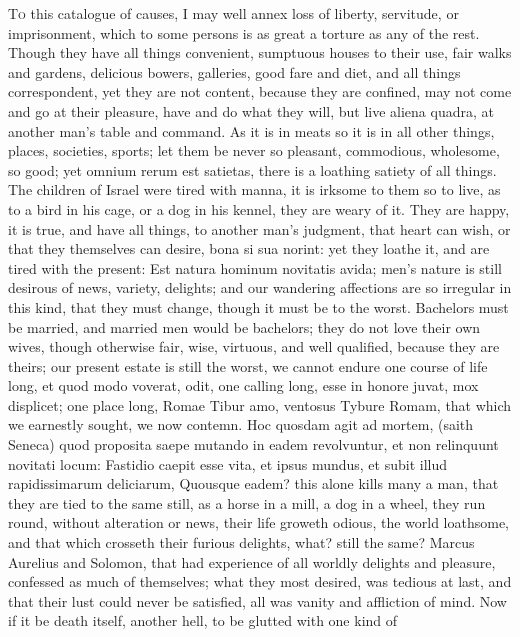 {\lettrine{T}{o} this catalogue of causes, I may well annex loss of liberty,
servitude, or imprisonment, which to some persons is as great a torture
as any of the rest. Though they have all things convenient, sumptuous
houses to their use, fair walks and gardens, delicious bowers,
galleries, good fare and diet, and all things correspondent, yet they
are not content, because they are confined, may not come and go at
their pleasure, have and do what they will, but live aliena
quadra, at another man's table and command. As it is in meats so
it is in all other things, places, societies, sports; let them be never
so pleasant, commodious, wholesome, so good; yet omnium rerum est
satietas, there is a loathing satiety of all things. The children of
Israel were tired with manna, it is irksome to them so to live, as to a
bird in his cage, or a dog in his kennel, they are weary of it. They
are happy, it is true, and have all things, to another man's judgment,
that heart can wish, or that they themselves can desire, bona si sua
norint: yet they loathe it, and are tired with the present: Est natura
hominum novitatis avida; men's nature is still desirous of news,
variety, delights; and our wandering affections are so irregular in
this kind, that they must change, though it must be to the worst.
Bachelors must be married, and married men would be bachelors; they do
not love their own wives, though otherwise fair, wise, virtuous, and
well qualified, because they are theirs; our present estate is still
the worst, we cannot endure one course of life long, et quod modo
voverat, odit, one calling long, esse in honore juvat, mox displicet;
one place long, Romae Tibur amo, ventosus Tybure Romam, that
which we earnestly sought, we now contemn. Hoc quosdam agit ad mortem,
(saith Seneca) quod proposita saepe mutando in eadem revolvuntur,
et non relinquunt novitati locum: Fastidio caepit esse vita, et ipsus
mundus, et subit illud rapidissimarum deliciarum, Quousque eadem? this
alone kills many a man, that they are tied to the same still, as a
horse in a mill, a dog in a wheel, they run round, without alteration
or news, their life groweth odious, the world loathsome, and that which
crosseth their furious delights, what? still the same? Marcus Aurelius
and Solomon, that had experience of all worldly delights and pleasure,
confessed as much of themselves; what they most desired, was tedious at
last, and that their lust could never be satisfied, all was vanity and
affliction of mind.
Now if it be death itself, another hell, to be glutted with one kind of
}
